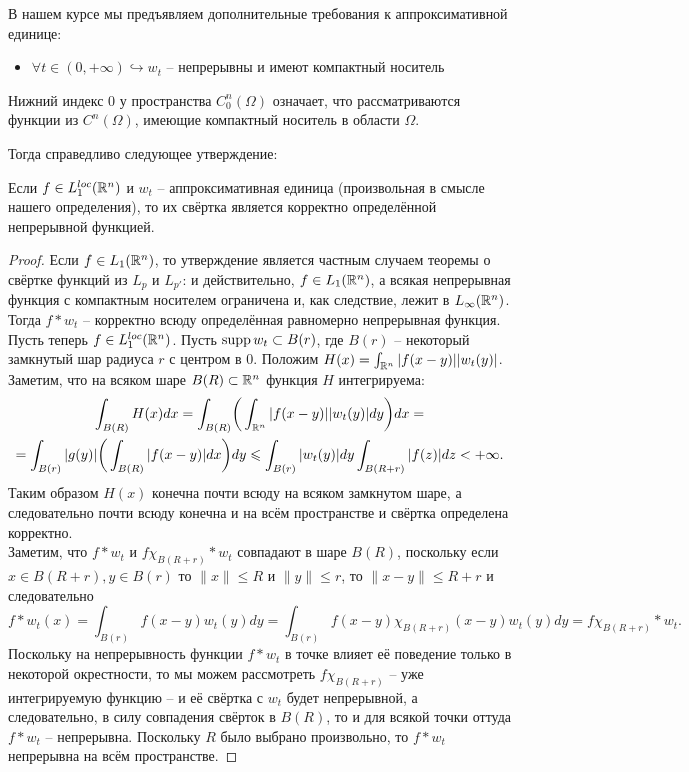 \begin{note}
	В нашем курсе мы предъявляем дополнительные требования к аппроксимативной единице:
	\begin{itemize}
		\item $\forall t \in (0, +\infty) \hookrightarrow w_t$ -- непрерывны и имеют компактный носитель
	\end{itemize}
    \begin{definition}
        Нижний индекс $0$ у пространства $C_0^n(\Omega)$ означает, что рассматриваются функции из $C^n(\Omega)$, имеющие компактный носитель в области $\Omega$. 
    \end{definition}
    
	Тогда справедливо следующее утверждение:
	\begin{theorem}
		Если $f \in L_1^{loc}(\mathbb{R}^n)$ и $w_t$ -- аппроксимативная единица (произвольная в смысле нашего определения), то их свёртка является корректно определённой непрерывной функцией.
	\end{theorem}
	\begin{proof}
		Если $f \in L_1(\mathbb{R}^n)$, то утверждение является частным случаем теоремы о свёртке функций из $L_p$ и $L_{p'}$: и действительно, $f \in L_1(\mathbb{R}^n)$, а всякая непрерывная функция с компактным носителем ограничена и, как следствие, лежит в $L_{\infty}(\mathbb{R}^n)$.
		Тогда $f * w_t$ -- корректно всюду определённая равномерно непрерывная функция. \\
		Пусть теперь $f \in L_1^{loc}(\mathbb{R}^n)$.
		Пусть $\operatorname{supp} w_t \subset B(r)$, где $B(r)$ -- некоторый замкнутый шар радиуса $r$ с центром в 0.
		Положим $H(x) = \int_{\mathbb{R}^n}|f(x - y)||w_t(y)|$.
		Заметим, что на всяком шаре $B(R) \subset \mathbb{R}^{n}$ функция $H$ интегрируема:
		\begin{multline*}
			\int_{B(R)} H(x)dx = \int_{B(R)} \biggr(\int_{\mathbb{R}^n}|f(x - y)||w_t(y)|dy\biggr)dx = \\ = \int_{B(r)} |g(y)| \biggr(\int_{B(R)} |f(x - y)|dx \biggr) dy \leqslant \int_{B(r)} |w_t(y)|dy \int_{B(R + r)} |f(z)|dz < +\infty.
		\end{multline*}
		Таким образом $H(x)$ конечна почти всюду на всяком замкнутом шаре, а следовательно почти всюду конечна и на всём пространстве и свёртка определена корректно. \\
		Заметим, что $f * w_t$ и $f\chi_{B(R + r)} * w_t$ совпадают в шаре $B(R)$, поскольку если $x \in B(R + r), y \in B(r)$ то $\|x\| \leq R$ и $\|y\| \leq r$, то $\|x - y\| \leq R + r$ и следовательно
		\[
		f * w_t(x) = \int_{B(r)} f(x - y)w_t(y)dy = \int_{B(r)} f(x - y)\chi_{B(R + r)}(x - y)w_t(y)dy = f\chi_{B(R + r)} * w_t.
		\]
		Поскольку на непрерывность функции $f * w_t$ в точке влияет её поведение только в некоторой окрестности, то мы можем рассмотреть $f\chi_{B(R + r)}$ -- уже интегрируемую функцию -- и её свёртка с $w_t$ будет непрерывной, а следовательно, в силу совпадения свёрток в $B(R)$, то и для всякой точки оттуда $f * w_t$ -- непрерывна.
		Поскольку $R$ было выбрано произвольно, то $f * w_t$ непрерывна на всём пространстве.
	\end{proof}
\end{note}

